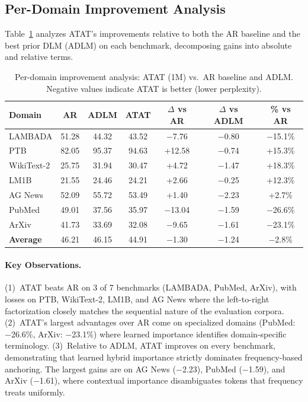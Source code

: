 \subsection{Per-Domain Improvement Analysis}

Table~\ref{tab:domain-improvement} analyzes ATAT's improvements relative to both the AR baseline and the best prior DLM (ADLM) on each benchmark, decomposing gains into absolute and relative terms.

\begin{table}[h]
\centering
\caption{Per-domain improvement analysis: ATAT (1M) vs.\ AR baseline and ADLM. Negative values indicate ATAT is better (lower perplexity).}
\label{tab:domain-improvement}
\begin{tabular}{lcccccc}
\toprule
\textbf{Domain} & \textbf{AR} & \textbf{ADLM} & \textbf{ATAT} & \textbf{$\Delta$ vs AR} & \textbf{$\Delta$ vs ADLM} & \textbf{\% vs AR} \\
\midrule
LAMBADA & 51.28 & 44.32 & 43.52 & $-$7.76 & $-$0.80 & $-$15.1\% \\
PTB & 82.05 & 95.37 & 94.63 & +12.58 & $-$0.74 & +15.3\% \\
WikiText-2 & 25.75 & 31.94 & 30.47 & +4.72 & $-$1.47 & +18.3\% \\
LM1B & 21.55 & 24.46 & 24.21 & +2.66 & $-$0.25 & +12.3\% \\
AG News & 52.09 & 55.72 & 53.49 & +1.40 & $-$2.23 & +2.7\% \\
PubMed & 49.01 & 37.56 & 35.97 & $-$13.04 & $-$1.59 & $-$26.6\% \\
ArXiv & 41.73 & 33.69 & 32.08 & $-$9.65 & $-$1.61 & $-$23.1\% \\
\midrule
\textbf{Average} & 46.21 & 46.15 & 44.91 & $-$1.30 & $-$1.24 & $-$2.8\% \\
\bottomrule
\end{tabular}
\end{table}

\paragraph{Key Observations.} (1)~ATAT beats AR on 3 of 7 benchmarks (LAMBADA, PubMed, ArXiv), with losses on PTB, WikiText-2, LM1B, and AG News where the left-to-right factorization closely matches the sequential nature of the evaluation corpora. (2)~ATAT's largest advantages over AR come on specialized domains (PubMed: $-$26.6\%, ArXiv: $-$23.1\%) where learned importance identifies domain-specific terminology. (3)~Relative to ADLM, ATAT improves on every benchmark, demonstrating that learned hybrid importance strictly dominates frequency-based anchoring. The largest gains are on AG News ($-$2.23), PubMed ($-$1.59), and ArXiv ($-$1.61), where contextual importance disambiguates tokens that frequency treats uniformly.

